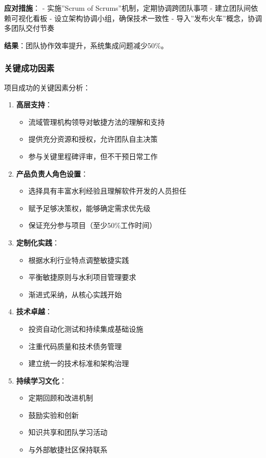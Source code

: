 \textbf{应对措施}： - 实施''Scrum of Scrums''机制，定期协调跨团队事项 -
建立团队间依赖可视化看板 - 设立架构协调小组，确保技术一致性 -
导入''发布火车''概念，协调多团队交付节奏

\textbf{结果}：团队协作效率提升，系统集成问题减少50\%。

\subsubsection{关键成功因素}\label{ux5173ux952eux6210ux529fux56e0ux7d20}

项目成功的关键因素分析：

\begin{enumerate}
\def\labelenumi{\arabic{enumi}.}
\tightlist
\item
  \textbf{高层支持}：

  \begin{itemize}
  \tightlist
  \item
    流域管理机构领导对敏捷方法的理解和支持
  \item
    提供充分资源和授权，允许团队自主决策
  \item
    参与关键里程碑评审，但不干预日常工作
  \end{itemize}
\item
  \textbf{产品负责人角色设置}：

  \begin{itemize}
  \tightlist
  \item
    选择具有丰富水利经验且理解软件开发的人员担任
  \item
    赋予足够决策权，能够确定需求优先级
  \item
    保证充分参与项目（至少50\%工作时间）
  \end{itemize}
\item
  \textbf{定制化实践}：

  \begin{itemize}
  \tightlist
  \item
    根据水利行业特点调整敏捷实践
  \item
    平衡敏捷原则与水利项目管理要求
  \item
    渐进式采纳，从核心实践开始
  \end{itemize}
\item
  \textbf{技术卓越}：

  \begin{itemize}
  \tightlist
  \item
    投资自动化测试和持续集成基础设施
  \item
    注重代码质量和技术债务管理
  \item
    建立统一的技术标准和架构治理
  \end{itemize}
\item
  \textbf{持续学习文化}：

  \begin{itemize}
  \tightlist
  \item
    定期回顾和改进机制
  \item
    鼓励实验和创新
  \item
    知识共享和团队学习活动
  \item
    与外部敏捷社区保持联系
  \end{itemize}
\end{enumerate}

